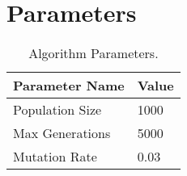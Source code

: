 \appendix
\addappheadtotoc

\titleformat{\chapter}[hang] 
{\normalfont\huge\bfseries}{\chaptertitlename\ \thechapter:}{1em}{} 

\chapter{Parameters}
\label{journal:app:Params}
\begin{table}[h!]
\caption{Algorithm Parameters.}
\begin{center}
\begin{tabularx}{\textwidth}{ |X|X| }
\hline
 {\bf Parameter Name} & {\bf Value}  \\ \hline \hline
 Population Size & 1000 \\
 Max Generations & 5000 \\ 
 Mutation Rate  & 0.03 \\
 \hline
\end{tabularx}
\end{center}
\vspace{-0.4cm}
\label{journal:tab:Params1}
\end{table} 

